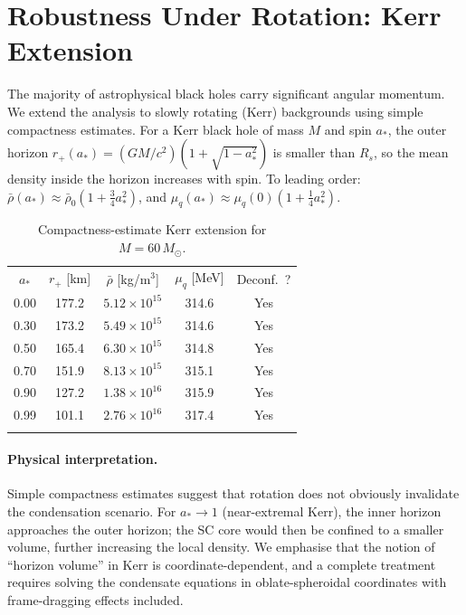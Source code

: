 \documentclass[epj]{svjour}
\begin{document}
\section{Robustness Under Rotation: Kerr Extension}
\label{sec:kerr}

The majority of astrophysical black holes carry significant angular momentum. We extend the analysis to slowly rotating (Kerr) backgrounds using simple compactness estimates. For a Kerr black hole of mass $M$ and spin $a_*$, the outer horizon $r_+(a_*) = (GM/c^2)(1 + \sqrt{1-a_*^2})$ is smaller than $R_s$, so the mean density inside the horizon increases with spin. To leading order: $\bar\rho(a_*) \approx \bar\rho_0(1 + \tfrac{3}{4}a_*^2)$, and $\mu_q(a_*) \approx \mu_q(0)(1 + \tfrac{1}{4}a_*^2)$.

\begin{table}
\caption{Compactness-estimate Kerr extension for $M = 60\,M_\odot$.}
\label{tab:kerr}
\begin{tabular}{ccccc}
\hline\noalign{\smallskip}
$a_*$ & $r_+$ [km] & $\bar\rho$ [kg/m$^3$] & $\mu_q$ [MeV] & Deconf.\ ? \\
\noalign{\smallskip}\hline\noalign{\smallskip}
0.00 & 177.2 & $5.12\times10^{15}$ & 314.6 & Yes \\
0.30 & 173.2 & $5.49\times10^{15}$ & 314.6 & Yes \\
0.50 & 165.4 & $6.30\times10^{15}$ & 314.8 & Yes \\
0.70 & 151.9 & $8.13\times10^{15}$ & 315.1 & Yes \\
0.90 & 127.2 & $1.38\times10^{16}$ & 315.9 & Yes \\
0.99 & 101.1 & $2.76\times10^{16}$ & 317.4 & Yes \\
\noalign{\smallskip}\hline
\end{tabular}
\end{table}

\paragraph{Physical interpretation.}
Simple compactness estimates suggest that rotation does not obviously invalidate the condensation scenario. For $a_* \to 1$ (near-extremal Kerr), the inner horizon approaches the outer horizon; the SC core would then be confined to a smaller volume, further increasing the local density. We emphasise that the notion of ``horizon volume'' in Kerr is coordinate-dependent, and a complete treatment requires solving the condensate equations in oblate-spheroidal coordinates with frame-dragging effects included.
\end{document}
